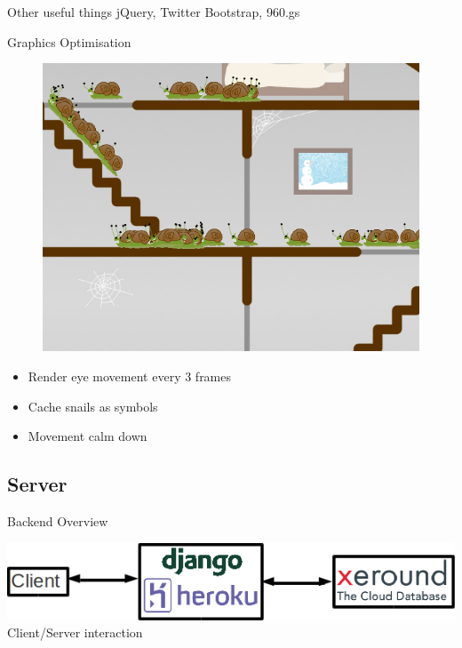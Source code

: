 \documentclass{beamer}
\begin{document}
\begin{frame}{Other useful things}
  jQuery, Twitter Bootstrap, 960.gs
\end{frame}

\begin{frame}{Graphics Optimisation}
  \begin{figure}[Snails]
    \centering
    \includegraphics[scale=0.25]{SnailsScreenshot.png}
  \end{figure}
  \begin{itemize}
    \item Render eye movement every 3 frames
    \item Cache snails as symbols
    \item Movement calm down
  \end{itemize}
\end{frame}

\subsection{Server}

\begin{frame}{Backend Overview}
  \begin{center}
    \includegraphics[scale=0.4]{client_server_structure.png}
    Client/Server interaction
  \end{center}
\end{frame}
\end{document}
